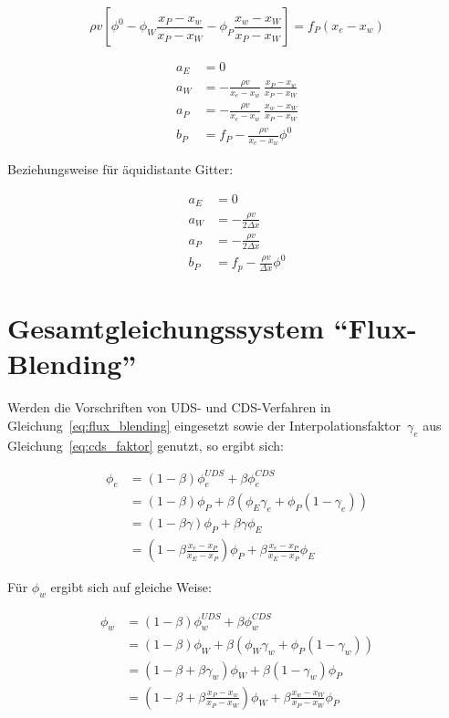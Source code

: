 \documentclass[11pt, ngerman,colorback,accentcolor=tud2d]{tudreport}
\begin{document}
\begin{equation*}
  \rho v \left[{
  \phi^0  -\phi_W \frac{x_P-x_w}{x_P-x_W} - \phi_P \frac{x_w-x_W}{x_P-x_W}
  }\right]
  = f_P(x_e-x_w)
\end{equation*}

\begin{align*}
  a_E &= 0\\
  a_W &= -\frac{\rho v}{x_e-x_w}\ \frac{x_P-x_w}{x_P-x_W}\\
  a_P &= -\frac{\rho v}{x_e-x_w}\ \frac{x_w-x_W}{x_P-x_W}\\
  b_P &= f_P - \frac{\rho v}{x_e-x_w} \phi^0
\end{align*}

Beziehungsweise für äquidistante Gitter:

\begin{align*}
  a_E &= 0\\
  a_W &=-\frac{\rho v}{2\Delta x}\\
  a_P &=-\frac{\rho v}{2 \Delta x}\\
  b_P &= f_p- \frac{\rho v}{\Delta x}\phi^0
\end{align*}






\section{Gesamtgleichungssystem ``Flux-Blending''}

Werden die Vorschriften von UDS- und CDS-Verfahren in Gleichung~\eqref{eq:flux_blending}
eingesetzt sowie der Interpolationsfaktor~$\gamma_e$ aus Gleichung~\eqref{eq:cds_faktor} genutzt, so ergibt sich:

\begin{align}
  \phi_e &= (1-\beta)\phi_e^{UDS} + \beta \phi_e^{CDS} \nonumber\\
         &= (1-\beta)\phi_P + \beta \left({\phi_E\gamma_e + \phi_P (1-\gamma_e)}\right) \nonumber\\
         &= (1-\beta \gamma) \phi_P + \beta \gamma \phi_E\\
         &= \left({1-\beta \frac{x_e-x_P}{x_E-x_P}}\right) \phi_P + \beta \frac{x_e-x_P}{x_E-x_P} \phi_E
\end{align}

Für $\phi_w$ ergibt sich auf gleiche Weise:

\begin{align}
  \phi_w &= (1-\beta)\phi_w^{UDS} + \beta \phi_w^{CDS} \nonumber\\
         &= (1-\beta)\phi_W + \beta \left({\phi_W \gamma_w + \phi_P (1-\gamma_w)}\right) \nonumber\\
         &= (1-\beta +\beta \gamma_w)\phi_W + \beta (1-\gamma_w)\phi_P\\
         &= \left({1-\beta + \beta \frac{x_P-x_w}{x_P-x_W}}\right) \phi_W + \beta \frac{x_w-x_W}{x_P-x_W} \phi_P
\end{align}
\end{document}
